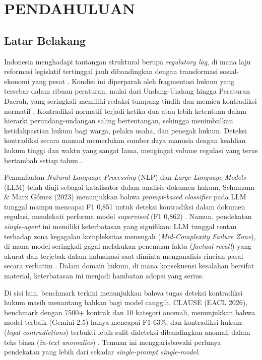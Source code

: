 \chapter{PENDAHULUAN}

\section{Latar Belakang}

Indonesia menghadapi tantangan struktural berupa \textit{regulatory lag}, di mana laju reformasi legislatif tertinggal jauh dibandingkan dengan transformasi sosial-ekonomi yang pesat \cite{rahmatus2017, nabilsyah2019}. Kondisi ini diperparah oleh fragmentasi hukum yang tersebar dalam ribuan peraturan, mulai dari Undang-Undang hingga Peraturan Daerah, yang seringkali memiliki redaksi tumpang tindih dan memicu kontradiksi normatif \cite{rahmatus2017, simangunsong2016}. Kontradiksi normatif terjadi ketika dua atau lebih ketentuan dalam hierarki perundang-undangan saling bertentangan, sehingga menimbulkan ketidakpastian hukum bagi warga, pelaku usaha, dan penegak hukum. Deteksi kontradiksi secara manual memerlukan sumber daya manusia dengan keahlian hukum tinggi dan waktu yang sangat lama, mengingat volume regulasi yang terus bertambah setiap tahun \cite{rahmatus2017}.

Pemanfaatan \textit{Natural Language Processing} (NLP) dan \textit{Large Language Models} (LLM) telah diuji sebagai katalisator dalam analisis dokumen hukum. Schumann \& Marx Gómez (2023) menunjukkan bahwa \textit{prompt-based classifier} pada LLM tunggal mampu mencapai F1 0,851 untuk deteksi kontradiksi dalam dokumen regulasi, mendekati performa model \textit{supervised} (F1 0,862) \cite{schumann2023}. Namun, pendekatan \textit{single-agent} ini memiliki keterbatasan yang signifikan: LLM tunggal rentan terhadap zona kegagalan kompleksitas menengah (\textit{Mid-Complexity Failure Zone}), di mana model seringkali gagal melakukan penemuan fakta (\textit{factual recall}) yang akurat dan terjebak dalam halusinasi saat diminta menganalisis rincian pasal secara verbatim \cite{clause2026}. Dalam domain hukum, di mana konsekuensi kesalahan bersifat material, keterbatasan ini menjadi hambatan adopsi yang serius.

Di sisi lain, benchmark terkini menunjukkan bahwa tugas deteksi kontradiksi hukum masih menantang bahkan bagi model canggih. CLAUSE (EACL 2026), benchmark dengan 7500+ kontrak dan 10 kategori anomali, menunjukkan bahwa model terbaik (Gemini 2.5) hanya mencapai F1 63\%, dan kontradiksi hukum (\textit{legal contradictions}) terbukti lebih sulit dideteksi dibandingkan anomali dalam teks biasa (\textit{in-text anomalies}) \cite{clause2026}. Temuan ini menggarisbawahi perlunya pendekatan yang lebih dari sekadar \textit{single-prompt single-model}.

